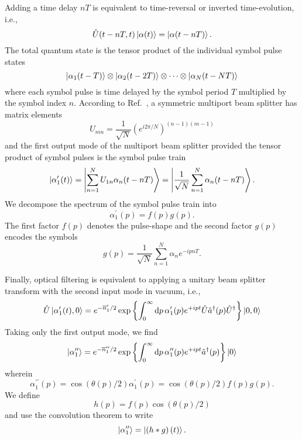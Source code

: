 Adding a time delay $nT$ is equivalent to time-reversal or inverted time-evolution, i.e.,
\begin{equation}
	\hat{U}(t-nT,t)
	\ket{\alpha(t)}
	=
	\ket{\alpha(t-nT)}.
\end{equation}
The total quantum state is the tensor product of the individual symbol pulse states
\begin{equation}
	\ket{\alpha_1(t-T)}
	\otimes
	\ket{\alpha_2(t-2T)}
	\otimes
	\dots
	\otimes
	\ket{\alpha_N(t-NT)}
\end{equation}
where each symbol pulse is time delayed by the symbol period $T$ multiplied by the symbol index $n$.
According to Ref.~\cite{Zukowski1997}, a symmetric multiport beam splitter has matrix elements
\begin{equation}
	U_{mn}
	=
	\frac{1}{\sqrt{N}}
	\left(e^{i2\pi/N}\right)^{(n-1)(m-1)}
\end{equation}
and the first output mode of the multiport beam splitter provided the tensor product of symbol pulses is the symbol pulse train
\begin{equation}
	\ket{\alpha_1^\prime(t)}
	=
	\ket{\sum_{n=1}^NU_{1n}\alpha_n(t-nT)}
	=
	\ket{\frac{1}{\sqrt{N}}\sum_{n=1}^N\alpha_n(t-nT)}
	.
\end{equation}
We decompose the spectrum of the symbol pulse train into
\begin{equation}
	\alpha_1^\prime(p)
	=
	f(p)g(p)
	.
\end{equation}
The first factor $f(p)$ denotes the pulse-shape and the second factor $g(p)$ encodes the symbols
\begin{equation}
	g(p)
	=
	\frac{1}{\sqrt{N}}
	\sum_{n=1}^N
	\alpha_n
	e^{-ipnT}
	.
\end{equation}

Finally, optical filtering is equivalent to applying a unitary beam splitter transform with the second input mode in vacuum, i.e.,
\begin{equation}
	\hat{U}\ket{\alpha_1^\prime(t),0}
	=
	e^{-\overline{n}_1^\prime/2}
	\exp\left\{
		\int_0^\infty\dd{p}
		\alpha_1^\prime(p)
		e^{+ipt}
		\hat{U}
		\hat{a}^\dagger(p)
		\hat{U}^\dagger
	\right\}
	\ket{0,0}
\end{equation}
Taking only the first output mode, we find
\begin{equation}
	\ket{\alpha_1^{\prime\prime}}
	=
	e^{-\overline{n}_1^{\prime\prime}/2}
	\exp\left\{
		\int_0^\infty\dd{p}
		\alpha_1^{\prime\prime}(p)
		e^{+ipt}
		\hat{a}^\dagger(p)
	\right\}
	\ket{0}
\end{equation}
wherein
\begin{equation}
	\alpha_1^{\prime\prime}(p)
	=
	\cos\left(\theta(p)/2\right)
	\alpha_1^\prime(p)
	=
	\cos\left(\theta(p)/2\right)
	f(p)g(p)
	.
\end{equation}
We define
\begin{equation}
	h(p)
	=
	f(p)
	\cos\left(\theta(p)/2\right)
\end{equation}
and use the convolution theorem to write
\begin{equation}
	\ket{\alpha_1^{\prime\prime}}
	=
	\ket{\left(h*g\right)(t)}
	.
\end{equation}
